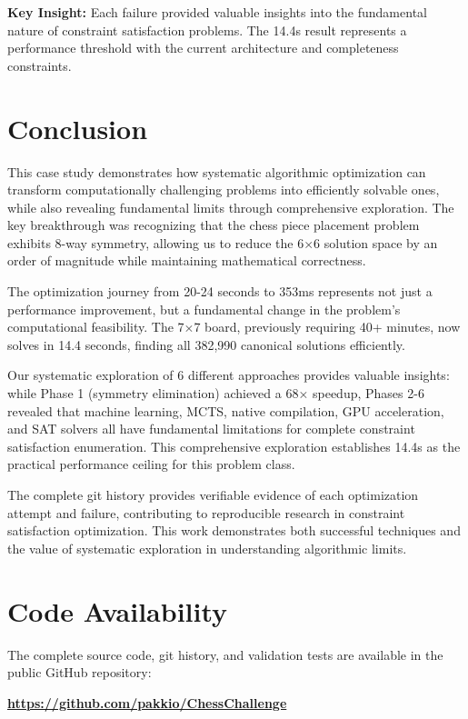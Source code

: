 \documentclass[12pt,a4paper]{article}
\theoremstyle{definition}
\begin{document}
\textbf{Key Insight:} Each failure provided valuable insights into the fundamental nature of constraint satisfaction problems. The 14.4s result represents a performance threshold with the current architecture and completeness constraints.

\section{Conclusion}

This case study demonstrates how systematic algorithmic optimization can transform computationally challenging problems into efficiently solvable ones, while also revealing fundamental limits through comprehensive exploration. The key breakthrough was recognizing that the chess piece placement problem exhibits 8-way symmetry, allowing us to reduce the 6$\times$6 solution space by an order of magnitude while maintaining mathematical correctness.

The optimization journey from 20-24 seconds to 353ms represents not just a performance improvement, but a fundamental change in the problem's computational feasibility. The 7$\times$7 board, previously requiring 40+ minutes, now solves in 14.4 seconds, finding all 382,990 canonical solutions efficiently.

Our systematic exploration of 6 different approaches provides valuable insights: while Phase 1 (symmetry elimination) achieved a 68× speedup, Phases 2-6 revealed that machine learning, MCTS, native compilation, GPU acceleration, and SAT solvers all have fundamental limitations for complete constraint satisfaction enumeration. This comprehensive exploration establishes 14.4s as the practical performance ceiling for this problem class.

The complete git history provides verifiable evidence of each optimization attempt and failure, contributing to reproducible research in constraint satisfaction optimization. This work demonstrates both successful techniques and the value of systematic exploration in understanding algorithmic limits.

\section{Code Availability}

The complete source code, git history, and validation tests are available in the public GitHub repository:

\begin{center}
\textbf{\url{https://github.com/pakkio/ChessChallenge}}
\end{center}
\end{document}
